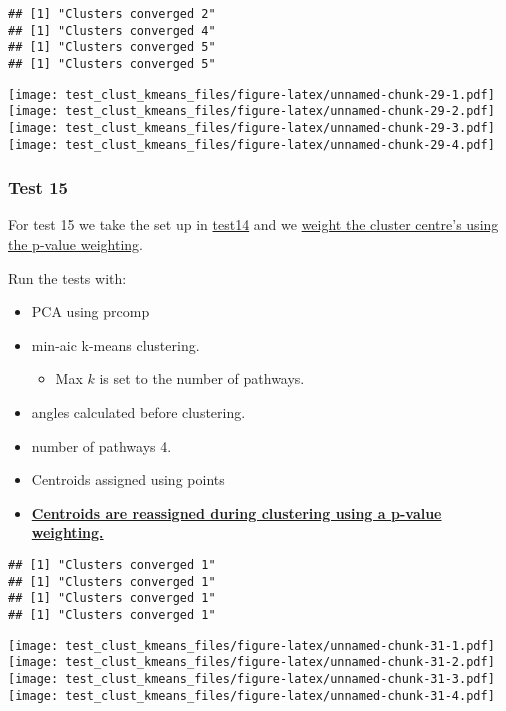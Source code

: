 \documentclass[
]{article}
\providecommand{\tightlist}{%
  \setlength{\itemsep}{0pt}\setlength{\parskip}{0pt}}
\begin{document}
\begin{verbatim}
## [1] "Clusters converged 2"
## [1] "Clusters converged 4"
## [1] "Clusters converged 5"
## [1] "Clusters converged 5"
\end{verbatim}

\texttt{[image: test\_clust\_kmeans\_files/figure-latex/unnamed-chunk-29-1.pdf]}
\texttt{[image: test\_clust\_kmeans\_files/figure-latex/unnamed-chunk-29-2.pdf]}
\texttt{[image: test\_clust\_kmeans\_files/figure-latex/unnamed-chunk-29-3.pdf]}
\texttt{[image: test\_clust\_kmeans\_files/figure-latex/unnamed-chunk-29-4.pdf]}

\hypertarget{test15}{%
\subsubsection{Test 15}\label{test15}}

For test 15 we take the set up in \protect\hyperlink{test14}{test14} and
we \protect\hyperlink{cluster_p_weight}{weight the cluster centre's
using the p-value weighting}.

Run the tests with:

\begin{itemize}
\tightlist
\item
  PCA using prcomp
\item
  min-aic k-means clustering.

  \begin{itemize}
  \tightlist
  \item
    Max \(k\) is set to the number of pathways.
  \end{itemize}
\item
  angles calculated before clustering.
\item
  number of pathways 4.
\item
  Centroids assigned using points
\item
  \protect\hyperlink{cluster_p_weight}{\textbf{Centroids are reassigned
  during clustering using a p-value weighting.}}
\end{itemize}

\begin{verbatim}
## [1] "Clusters converged 1"
## [1] "Clusters converged 1"
## [1] "Clusters converged 1"
## [1] "Clusters converged 1"
\end{verbatim}

\texttt{[image: test\_clust\_kmeans\_files/figure-latex/unnamed-chunk-31-1.pdf]}
\texttt{[image: test\_clust\_kmeans\_files/figure-latex/unnamed-chunk-31-2.pdf]}
\texttt{[image: test\_clust\_kmeans\_files/figure-latex/unnamed-chunk-31-3.pdf]}
\texttt{[image: test\_clust\_kmeans\_files/figure-latex/unnamed-chunk-31-4.pdf]}
\end{document}
